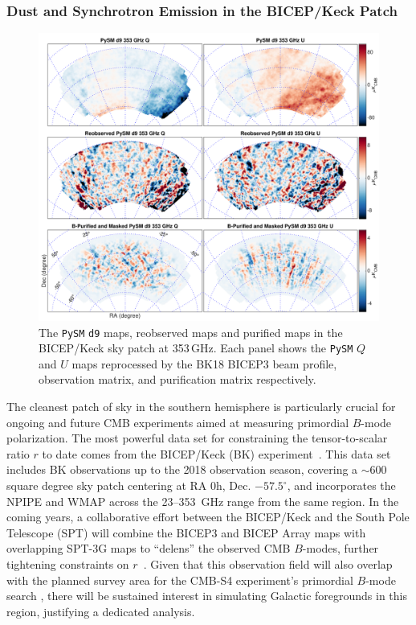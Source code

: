 \documentclass[twocolumn]{aastex631}
\begin{document}
\subsubsection{Dust and Synchrotron Emission in the BICEP/Keck Patch}
\label{sec:BK_validation}
\begin{figure}
    \centering
    \includegraphics[width=2.\columnwidth]{figures/pysm_d9_353_delta_reobs_B_pub.pdf}
    \caption{The \texttt{PySM} \texttt{d9} maps, reobserved maps and purified maps in the BICEP/Keck sky patch at 353\,GHz. Each panel shows the
    \texttt{PySM} $Q$ and $U$ maps reprocessed by the BK18 BICEP3 beam profile, observation matrix, and purification matrix respectively.}
    \label{fig:psym_BKmatrix}
\end{figure}

The cleanest patch of sky in the southern hemisphere is particularly crucial for ongoing and future CMB experiments aimed at measuring primordial $B$-mode polarization. The most powerful data set for constraining the tensor-to-scalar ratio $r$ to date comes from the BICEP/Keck (BK) experiment~\citep[``BK18'';][]{Ade:2021}. This data set includes BK observations up to the 2018 observation season, covering a $\sim 600$ square degree sky patch centering at RA 0h, Dec. $-57.5^{\circ}$, and incorporates the NPIPE and WMAP across the 23--353~GHz range from the same region. In the coming years, a collaborative effort between the BICEP/Keck and the South Pole Telescope (SPT) will combine the BICEP3 and BICEP Array maps with overlapping SPT-3G maps to ``delens'' the observed CMB $B$-modes, further tightening constraints on $r$~\citep{TheBICEP/KeckCollaboration:2024}. Given that this observation field will also overlap with the planned survey area for the CMB-S4 experiment's primordial $B$-mode search \citep{Abazajian:2022}, there will be sustained interest in simulating Galactic foregrounds in this region, justifying a dedicated analysis. 
\end{document}

